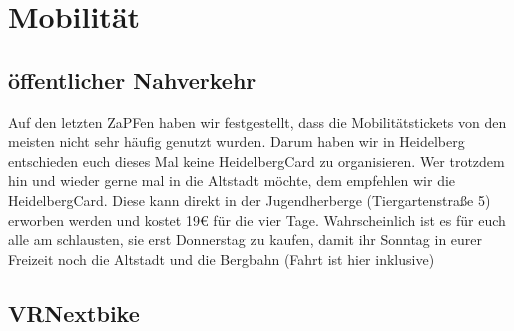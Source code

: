 \section{Mobilität}
  \subsection{öffentlicher Nahverkehr}
    Auf den letzten ZaPFen haben wir festgestellt, dass die Mobilitätstickets von den meisten
    nicht sehr häufig genutzt wurden. Darum haben wir in Heidelberg entschieden euch
    dieses Mal keine HeidelbergCard zu organisieren.
    Wer trotzdem hin und wieder gerne mal in die Altstadt möchte, dem empfehlen wir die
    HeidelbergCard. Diese kann direkt in der Jugendherberge (Tiergartenstraße 5)
    erworben werden und kostet 19€ für die vier Tage.
    Wahrscheinlich ist es für euch alle am schlausten, sie erst Donnerstag zu kaufen,
    damit ihr Sonntag in eurer Freizeit noch die Altstadt und die Bergbahn (Fahrt ist hier inklusive)
  \subsection{VRNextbike}
